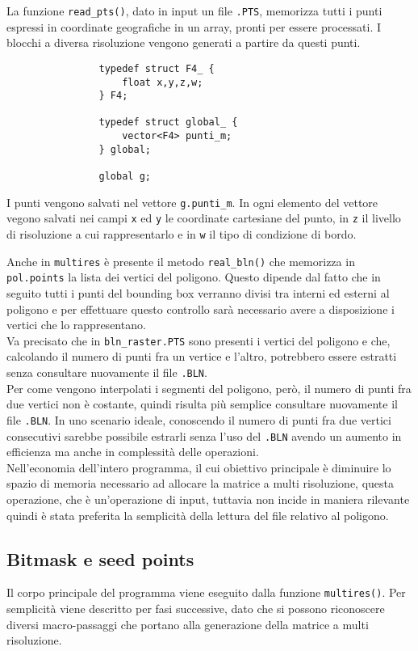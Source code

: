 			La funzione \texttt{read\_pts()}, dato in input un file \texttt{.PTS}, memorizza tutti i punti espressi in coordinate geografiche in un array, pronti per essere processati. I blocchi a diversa risoluzione vengono generati a partire da questi punti.
			\begin{verbatim}
				typedef struct F4_ {
				    float x,y,z,w;
				} F4;

				typedef struct global_ {
				    vector<F4> punti_m;
				} global;

				global g;
			\end{verbatim}
			I punti vengono salvati nel vettore \texttt{g.punti\_m}. In ogni elemento del vettore vegono salvati nei campi \texttt{x} ed \texttt{y} le coordinate cartesiane del punto, in \texttt{z} il livello di risoluzione a cui rappresentarlo e in \texttt{w} il tipo di condizione di bordo. 

			Anche in \texttt{multires} \`{e} presente il metodo \texttt{real\_bln()} che memorizza in \texttt{pol.points} la lista dei vertici del poligono. Questo dipende dal fatto che in seguito tutti i punti del bounding box verranno divisi tra interni ed esterni al poligono e per effettuare questo controllo sar\`{a} necessario avere a disposizione i vertici che lo rappresentano.\\
			Va precisato che in \texttt{bln\_raster.PTS} sono presenti i vertici del poligono e che, calcolando il numero di punti fra un vertice e l'altro, potrebbero essere estratti senza consultare nuovamente il file \texttt{.BLN}.\\
			Per come vengono interpolati i segmenti del poligono, per\`{o}, il numero di punti fra due vertici non \`{e} costante, quindi risulta pi\`{u} semplice consultare nuovamente il file \texttt{.BLN}.
			In uno scenario ideale, conoscendo il numero di punti fra due vertici consecutivi sarebbe possibile estrarli senza l'uso del \texttt{.BLN} avendo un aumento in efficienza ma anche in complessit\`{a} delle operazioni. \\
			Nell'economia dell'intero programma, il cui obiettivo principale \`{e} diminuire lo spazio di memoria necessario ad allocare la matrice a multi risoluzione, questa operazione, che \`{e} un'operazione di input, tuttavia non incide in maniera rilevante quindi \`{e} stata preferita la semplicit\`{a} della lettura del file relativo al poligono. 

		\subsection{Bitmask e seed points}
			Il corpo principale del programma viene eseguito dalla funzione \texttt{multires()}. Per semplicit\`{a} viene descritto per fasi successive, dato che si possono riconoscere diversi macro-passaggi che portano alla generazione della matrice a multi risoluzione.

